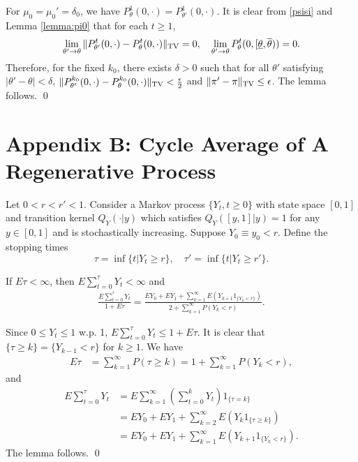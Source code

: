 \documentclass[graybox]{svmult}
\begin{document}
For $\mu_0=\mu_0'=\delta_0$, we have $P^1_\theta(0, \cdot)=P^1_{\theta'}(0,\cdot)$. It is clear from \eqref{psisi} and Lemma \ref{lemma:pi0}
 that for each $t\ge 1$,
$$
\lim_{\theta'\to \theta}\|P_{\theta'}^t (0, \cdot)- P_\theta^t (0, \cdot) \|_{\rm TV} =0, \quad \lim_{\theta'\to \theta}  P^t_\theta(0, [\underline\theta, \overline\theta))=0.
$$
Therefore, for the fixed $k_0$, there exists $\delta>0$ such
that for all $\theta'$ satisfying  $|\theta'-\theta|<\delta$,
$ \|P_{\theta'}^{k_0} (0, \cdot)- P_\theta^{k_0} (0, \cdot) \|_{\rm TV} <
\frac{\epsilon}{2}$ and   $\|\pi'-\pi\|_{\rm TV}\le \epsilon$.   The lemma follows. \qed




\section*{Appendix B:  Cycle Average of A Regenerative Process}
\renewcommand{\theequation}{B.\arabic{equation}}
\setcounter{equation}{0}
\renewcommand{\thetheorem}{B.\arabic{theorem}}
\setcounter{theorem}{0}
\renewcommand{\thelemma}{B.\arabic{lemma}}
\setcounter{lemma}{0}
\renewcommand{\theremark}{B.\arabic{remark}}
\setcounter{remark}{0}



Let $0<r<r'<1$.
Consider a Markov process $\{Y_t, t\ge 0\}$ with  state space $[0, 1]$
  and transition kernel $Q_Y(\cdot|y)$ which satisfies
 $Q_Y([y,1]|y)=1$ for any $y\in [0, 1]$ and is stochastically increasing. Suppose $Y_0\equiv y_0<r$.
Define the stopping times
$$
\tau=\inf \{t|Y_t\ge r\},\quad  \tau'=\inf\{t|Y_t\ge r'\}.
$$

\begin{lemma} \label{lemma:yav}
If $E\tau<\infty $, then  $ E\sum_{t=0}^\tau Y_t<\infty$ and
\begin{align}
\frac{E\sum_{t=0}^\tau Y_t}{1+E\tau }
 =\frac{EY_0+ EY_1+ \sum_{k=1}^\infty E(Y_{k+1} 1_{\{Y_k<r\}})}{2+
 \sum_{k=1 }^\infty P(Y_k<r)  }.
 \end{align}
\end{lemma}


\proof Since $0\le Y_t\le 1 $ w.p. 1, $ E\sum_{t=0}^\tau Y_t\le 1+E\tau$.
 It is clear that $\{\tau\ge k\}= \{Y_{k-1}<r\}$ for
 $k\ge 1$.
 We have
\begin{align}
E\tau &= \sum_{k=1}^\infty P(\tau\ge k)=1+ \sum_{k=1}^\infty P(Y_{k}<r), \label{etau}
\end{align}
and
\begin{align*}
E\sum_{t=0}^\tau Y_t&= E \sum_{k=1}^\infty \left(\sum_{t=0}^kY_t\right)1_{\{\tau=k\}}  \\
&  =EY_0+EY_1+ \sum_{k=2}^\infty E(Y_{k} 1_{\{\tau\ge k\}})\\
& =EY_0+ EY_1+\sum_{k=1}^\infty E(Y_{k+1} 1_{\{Y_k<r\}}).
\end{align*}
The lemma follows. \qed
\end{document}
